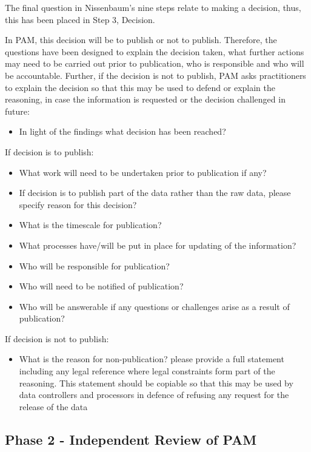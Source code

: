 The final question in Nissenbaum's nine steps relate to making a decision, thus, this has been placed in Step 3, Decision. 

In PAM, this decision will be to publish or not to publish. Therefore, the questions have been designed to explain the decision taken, what further actions may need to be carried out prior to publication, who is responsible and who will be accountable. Further, if the decision is not to publish, PAM asks practitioners to explain the decision so that this may be used to defend or explain the reasoning, in case the information is requested or the decision challenged in future:\\
\begin{itemize}
\item In light of the findings what decision has been reached?\\
\end{itemize}

If decision is to publish:
\begin{itemize}
\item What work will need to be undertaken prior to publication if any?
\item If decision is to publish part of the data rather than the raw data, please specify reason for this decision?
\item What is the timescale for publication?
\item What processes have/will be put in place for updating of the information?
\item Who will be responsible for publication?
\item Who will need to be notified of publication?
\item Who will be answerable if any questions or challenges arise as a result of publication?
\end{itemize}
If decision is not to publish:
\begin{itemize}
\item What is the reason for non-publication?  please provide a full statement including any legal reference where legal constraints form part of the reasoning. This statement should be copiable so that this may be used by data controllers and processors in defence of refusing any request for the release of the data
\end{itemize}

\subsection{Phase 2 - Independent Review of PAM}
